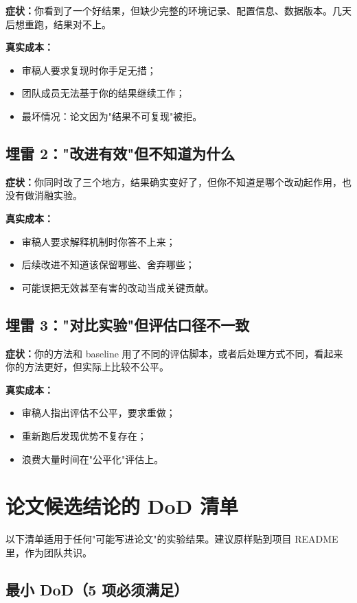 \textbf{症状：}你看到了一个好结果，但缺少完整的环境记录、配置信息、数据版本。几天后想重跑，结果对不上。

\textbf{真实成本：}
\begin{itemize}
  \item 审稿人要求复现时你手足无措；
  \item 团队成员无法基于你的结果继续工作；
  \item 最坏情况：论文因为"结果不可复现"被拒。
\end{itemize}

\subsection{埋雷 2："改进有效"但不知道为什么}

\textbf{症状：}你同时改了三个地方，结果确实变好了，但你不知道是哪个改动起作用，也没有做消融实验。

\textbf{真实成本：}
\begin{itemize}
  \item 审稿人要求解释机制时你答不上来；
  \item 后续改进不知道该保留哪些、舍弃哪些；
  \item 可能误把无效甚至有害的改动当成关键贡献。
\end{itemize}

\subsection{埋雷 3："对比实验"但评估口径不一致}

\textbf{症状：}你的方法和 baseline 用了不同的评估脚本，或者后处理方式不同，看起来你的方法更好，但实际上比较不公平。

\textbf{真实成本：}
\begin{itemize}
  \item 审稿人指出评估不公平，要求重做；
  \item 重新跑后发现优势不复存在；
  \item 浪费大量时间在"公平化"评估上。
\end{itemize}

\section{论文候选结论的 DoD 清单}

以下清单适用于任何"可能写进论文"的实验结果。建议原样贴到项目 README 里，作为团队共识。

\subsection{最小 DoD（5 项必须满足）}

